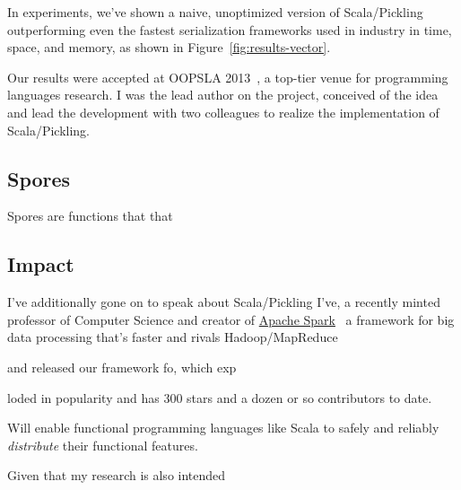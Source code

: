 \documentclass[acmtocl]{acmtrans2m}
\begin{document}
In experiments, we've shown a naive, unoptimized version of Scala/Pickling
outperforming even the fastest serialization frameworks used in industry in time, space, and memory, as shown in Figure~\ref{fig:results-vector}.

Our results were accepted at OOPSLA 2013~\cite{Pickling}, a top-tier venue for programming languages research. I was the lead author on the project, conceived of the idea and lead the development with two colleagues to realize the implementation of Scala/Pickling.

\vspace{-0.2in}
\subsection*{\textbf{Spores}}
\vspace{-0.1in}

Spores are  functions that that

\vspace{-0.2in}
\subsection*{\textbf{Impact}}
\vspace{-0.1in}

I've additionally gone on to speak about Scala/Pickling I've, a recently minted professor of Computer Science and creator of \href{https://spark.incubator.apache.org/}{Apache Spark}~\cite{Spark} a framework for big data processing that's faster and rivals Hadoop/MapReduce

and released our framework fo, which exp



loded in popularity and has 300 stars and a dozen or so contributors to date.


Will enable functional programming languages like Scala to safely and reliably
\textit{distribute} their functional features.

Given that my research is also intended
\end{document}
